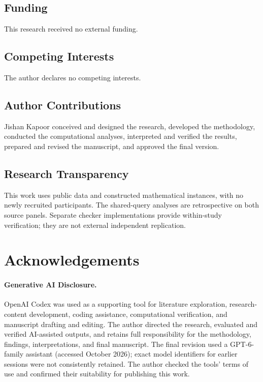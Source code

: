 \documentclass[12pt]{article}
\begin{document}
\subsection*{Funding}
This research received no external funding.

\subsection*{Competing Interests}
The author declares no competing interests.

\subsection*{Author Contributions}
Jishan Kapoor conceived and designed the research, developed the methodology,
conducted the computational analyses, interpreted and verified the results,
prepared and revised the manuscript, and approved the final version.

\subsection*{Research Transparency}
This work uses public data and constructed mathematical instances, with
no newly recruited participants. The shared-query analyses are retrospective
on both source panels. Separate checker implementations provide within-study
verification; they are not external independent replication.

\section*{Acknowledgements}
\paragraph{Generative AI Disclosure.}
OpenAI Codex was used as a supporting tool for literature exploration,
research-content development, coding assistance, computational verification,
and manuscript drafting and editing.
The author directed the research, evaluated and verified AI-assisted outputs,
and retains full responsibility for the methodology, findings, interpretations,
and final manuscript. The final revision used a GPT-6-family assistant
(accessed October 2026); exact model identifiers for earlier sessions were
not consistently retained. The author checked the tools' terms of use and
confirmed their suitability for publishing this work.
\end{document}
